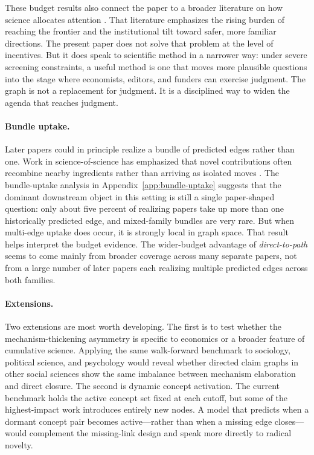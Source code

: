 \documentclass[11pt]{article}
\begin{document}
These budget results also connect the paper to a broader literature on how science allocates
attention \citep{jones2009burden,bloom2020ideas,azoulay2011incentives,foster2015tradition,packalen2020stagnation}.
That literature emphasizes the rising burden of reaching the frontier and the institutional
tilt toward safer, more familiar directions. The present paper does not solve that problem
at the level of incentives. But it does speak to scientific method in a narrower way: under
severe screening constraints, a useful method is one that moves more plausible questions
into the stage where economists, editors, and funders can exercise judgment. The graph is
not a replacement for judgment. It is a disciplined way to widen the agenda that reaches
judgment.

\paragraph{Bundle uptake.}
Later papers could in principle realize a bundle of predicted edges rather than one. Work in science-of-science has emphasized that
novel contributions often recombine nearby ingredients rather than arriving as isolated
moves \citep{uzzi2013atypical,foster2015tradition,fortunato2018science}. The bundle-uptake
analysis in Appendix~\ref{app:bundle-uptake} suggests that the dominant downstream object in
this setting is still a single paper-shaped question: only about five percent of realizing
papers take up more than one historically predicted edge, and mixed-family bundles are very
rare. But when multi-edge uptake does occur, it is strongly local in graph space. That
result helps interpret the budget evidence. The wider-budget advantage of
\emph{direct-to-path} seems to come mainly from broader coverage across many separate
papers, not from a large number of later papers each realizing multiple predicted edges across both families.

\paragraph{Extensions.}
Two extensions are most worth developing. The first is to test whether the mechanism-thickening asymmetry is specific to economics or a broader feature of cumulative science. Applying the same walk-forward benchmark to sociology, political science, and psychology would reveal whether directed claim graphs in other social sciences show the same imbalance between mechanism elaboration and direct closure. The second is dynamic concept activation. The current benchmark holds the active concept set fixed at each cutoff, but some of the highest-impact work introduces entirely new nodes. A model that predicts when a dormant concept pair becomes active---rather than when a missing edge closes---would complement the missing-link design and speak more directly to radical novelty.
\end{document}
